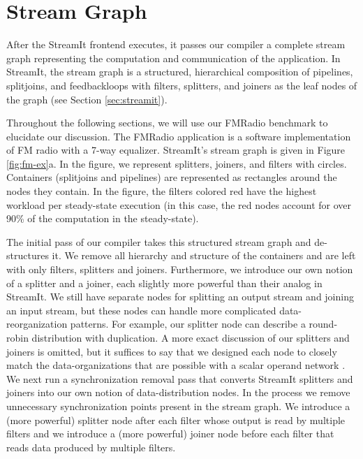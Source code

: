 \section{Stream Graph} 

\begin{figure*}
\centering
{}
\caption{FMRadio with a 7-way equalizer after the passes of the
SpaceTime Compiler.
\protect\label{fig:fm-ex}}
\end{figure*}

After the StreamIt frontend executes, it passes our compiler a
complete stream graph representing the computation and communication
of the application.  In StreamIt, the stream graph is a structured,
hierarchical composition of pipelines, splitjoins, and feedbackloops
with filters, splitters, and joiners as the leaf nodes of the graph
(see Section
\ref{sec:streamit}).  

Throughout the following sections, we will use our FMRadio benchmark
to elucidate our discussion.  The FMRadio application is a software
implementation of FM radio with a 7-way equalizer.  StreamIt's stream
graph is given in Figure \ref{fig:fm-ex}a.  In the figure, we
represent splitters, joiners, and filters with circles.  Containers
(splitjoins and pipelines) are represented as rectangles around the
nodes they contain.  In the figure, the filters colored red have the
highest workload per steady-state execution (in this case, the red
nodes account for over 90\% of the computation in the steady-state).

The initial pass of our compiler takes this structured stream graph
and de-structures it.  We remove all hierarchy and structure of the
containers and are left with only filters, splitters and joiners.
Furthermore, we introduce our own notion of a splitter and a joiner,
each slightly more powerful than their analog in StreamIt.  We still
have separate nodes for splitting an output stream and joining an
input stream, but these nodes can handle more complicated
data-reorganization patterns.  For example, our splitter node can
describe a round-robin distribution with duplication.  A more exact
discussion of our splitters and joiners is omitted, but it suffices to
say that we designed each node to closely match the data-organizations
that are possible with a scalar operand network \cite{scalaroperands}.
We next run a synchronization removal pass that converts StreamIt
splitters and joiners into our own notion of data-distribution nodes.
In the process we remove unnecessary synchronization points present in
the stream graph.  We introduce a (more powerful) splitter node after
each filter whose output is read by multiple filters and we introduce
a (more powerful) joiner node before each filter that reads data
produced by multiple filters.

